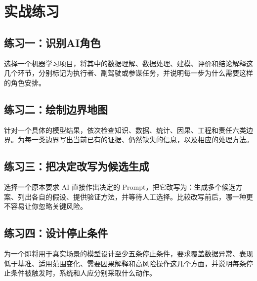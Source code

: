 \section{实战练习}

\subsection*{练习一：识别AI角色}

选择一个机器学习项目，将其中的数据理解、数据处理、建模、评价和结论解释这几个环节，分别标记为执行者、副驾驶或参谋任务，并说明每一步为什么需要这样的角色安排。

\subsection*{练习二：绘制边界地图}

针对一个具体的模型结果，依次检查知识、数据、统计、因果、工程和责任六类边界。为每一类边界写出当前已有的证据、仍然缺失的信息，以及相应的处理方法。

\subsection*{练习三：把决定改写为候选生成}

选择一个原本要求 AI 直接作出决定的 Prompt，把它改写为：生成多个候选方案、列出各自的假设、提供验证方法，并等待人工选择。比较改写前后，哪一种更不容易让你忽略关键风险。

\subsection*{练习四：设计停止条件}

为一个即将用于真实场景的模型设计至少五条停止条件，要求覆盖数据异常、表现低于基准、适用范围变化、需要因果解释和高风险操作这几个方面，并说明每条停止条件被触发时，系统和人应分别采取什么动作。

